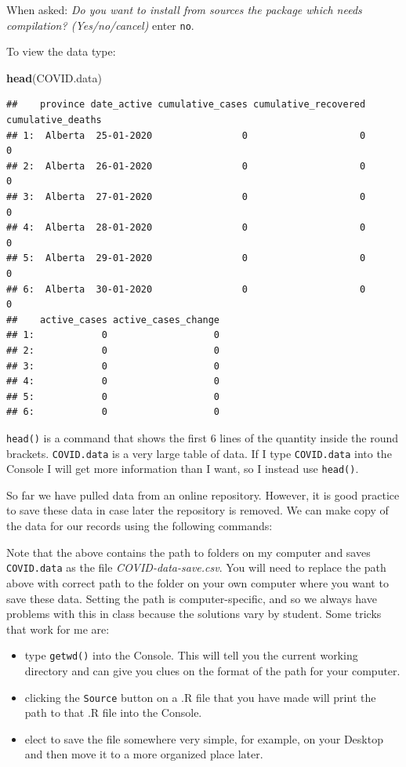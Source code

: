 \documentclass[]{book}
\newenvironment{Shaded}{\begin{snugshade}}{\end{snugshade}}
\newcommand{\KeywordTok}[1]{\textcolor[rgb]{0.13,0.29,0.53}{\textbf{{#1}}}}
\newcommand{\NormalTok}[1]{{#1}}
\begin{document}
When asked: \emph{Do you want to install from sources the package which
needs compilation? (Yes/no/cancel)} enter \texttt{no}.

To view the data type:

\begin{Shaded}
\begin{Highlighting}[]
\KeywordTok{head}\NormalTok{(COVID.data)}
\end{Highlighting}
\end{Shaded}

\begin{verbatim}
##    province date_active cumulative_cases cumulative_recovered cumulative_deaths
## 1:  Alberta  25-01-2020                0                    0                 0
## 2:  Alberta  26-01-2020                0                    0                 0
## 3:  Alberta  27-01-2020                0                    0                 0
## 4:  Alberta  28-01-2020                0                    0                 0
## 5:  Alberta  29-01-2020                0                    0                 0
## 6:  Alberta  30-01-2020                0                    0                 0
##    active_cases active_cases_change
## 1:            0                   0
## 2:            0                   0
## 3:            0                   0
## 4:            0                   0
## 5:            0                   0
## 6:            0                   0
\end{verbatim}

\texttt{head()} is a command that shows the first 6 lines of the
quantity inside the round brackets. \texttt{COVID.data} is a very large
table of data. If I type \texttt{COVID.data} into the Console I will get
more information than I want, so I instead use \texttt{head()}.

So far we have pulled data from an online repository. However, it is
good practice to save these data in case later the repository is
removed. We can make copy of the data for our records using the
following commands:

Note that the above contains the path to folders on my computer and
saves \texttt{COVID.data} as the file \emph{COVID-data-save.csv}. You
will need to replace the path above with correct path to the folder on
your own computer where you want to save these data. Setting the path is
computer-specific, and so we always have problems with this in class
because the solutions vary by student. Some tricks that work for me are:

\begin{itemize}
\item
  type \texttt{getwd()} into the Console. This will tell you the current
  working directory and can give you clues on the format of the path for
  your computer.
\item
  clicking the \texttt{Source} button on a .R file that you have made
  will print the path to that .R file into the Console.
\item
  elect to save the file somewhere very simple, for example, on your
  Desktop and then move it to a more organized place later.
\end{itemize}
\end{document}
